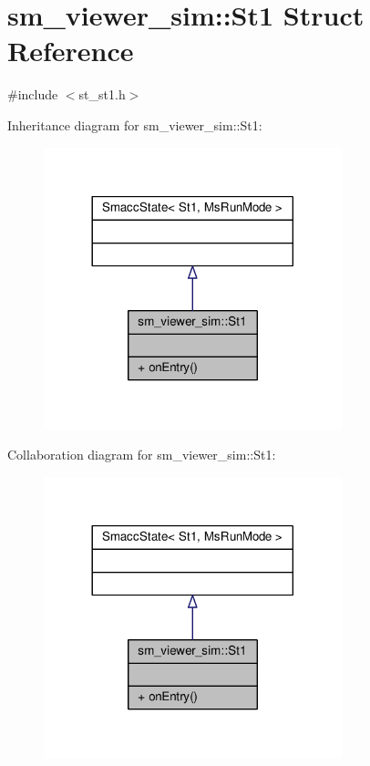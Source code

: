 \hypertarget{structsm__viewer__sim_1_1St1}{}\section{sm\+\_\+viewer\+\_\+sim\+:\+:St1 Struct Reference}
\label{structsm__viewer__sim_1_1St1}


{\ttfamily \#include $<$st\+\_\+st1.\+h$>$}



Inheritance diagram for sm\+\_\+viewer\+\_\+sim\+:\+:St1\+:
\nopagebreak
\begin{figure}[H]
\begin{center}
\leavevmode
\includegraphics[width=245pt]{structsm__viewer__sim_1_1St1__inherit__graph}
\end{center}
\end{figure}


Collaboration diagram for sm\+\_\+viewer\+\_\+sim\+:\+:St1\+:
\nopagebreak
\begin{figure}[H]
\begin{center}
\leavevmode
\includegraphics[width=245pt]{structsm__viewer__sim_1_1St1__coll__graph}
\end{center}
\end{figure}
